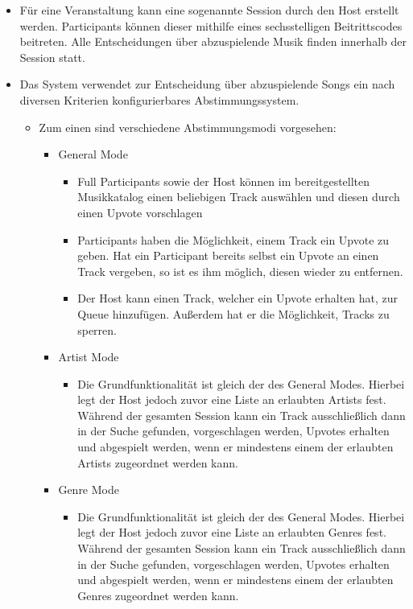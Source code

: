 \documentclass[oneside, ngerman]{sdqtechreport}
\begin{document}
\begin{itemize}
\begin{itemize}
    \end{itemize}
    \item Für eine Veranstaltung kann eine sogenannte Session durch den Host erstellt werden. Participants können dieser mithilfe eines sechsstelligen Beitrittscodes beitreten. Alle Entscheidungen über abzuspielende Musik finden innerhalb der Session statt.
    \item Das System verwendet zur Entscheidung über abzuspielende Songs ein nach diversen Kriterien konfigurierbares Abstimmungssystem.
    \begin{itemize}
        \item Zum einen sind verschiedene Abstimmungsmodi vorgesehen:
        \begin{itemize}
            \item General Mode
            \begin{itemize}
                \item Full Participants sowie der Host können im bereitgestellten Musikkatalog einen beliebigen Track auswählen und diesen durch einen Upvote vorschlagen
                \item Participants haben die Möglichkeit, einem Track ein Upvote zu geben. Hat ein Participant bereits selbst ein Upvote an einen Track vergeben, so ist es ihm möglich, diesen wieder zu entfernen.
                \item Der Host kann einen Track, welcher ein Upvote erhalten hat, zur Queue hinzufügen. Außerdem hat er die Möglichkeit, Tracks zu sperren.
            \end{itemize}
            \item Artist Mode
            \begin{itemize}
                \item Die Grundfunktionalität ist gleich der des General Modes. Hierbei legt der Host jedoch zuvor eine Liste an erlaubten Artists fest. Während der gesamten Session kann ein Track ausschließlich dann in der Suche gefunden, vorgeschlagen werden, Upvotes erhalten und abgespielt werden, wenn er mindestens einem der erlaubten Artists zugeordnet werden kann.
            \end{itemize}
            \item Genre Mode
            \begin{itemize}
                \item Die Grundfunktionalität ist gleich der des General Modes. Hierbei legt der Host jedoch zuvor eine Liste an erlaubten Genres fest. Während der gesamten Session kann ein Track ausschließlich dann in der Suche gefunden, vorgeschlagen werden, Upvotes erhalten und abgespielt werden, wenn er mindestens einem der erlaubten Genres zugeordnet werden kann.

\end{itemize}
\end{itemize}
\end{itemize}
\end{itemize}
\end{document}
